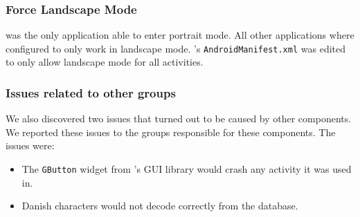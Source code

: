 \subsubsection{Force Landscape Mode}
\launcher was the only application able to enter portrait mode. 
All other \giraf applications where configured to only work in landscape mode.
\launcher's \lstinline{AndroidManifest.xml} was edited to only allow landscape mode for all activities.

\subsubsection{Issues related to other groups}
We also discovered two issues that turned out to be caused by other \giraf components. We reported these issues to the groups responsible for these components. The issues were:

\begin{itemize}
\item The \lstinline{GButton} widget from \giraf's GUI library would crash any activity it was used in.
\item Danish characters would not decode correctly from the database.
\end{itemize}

